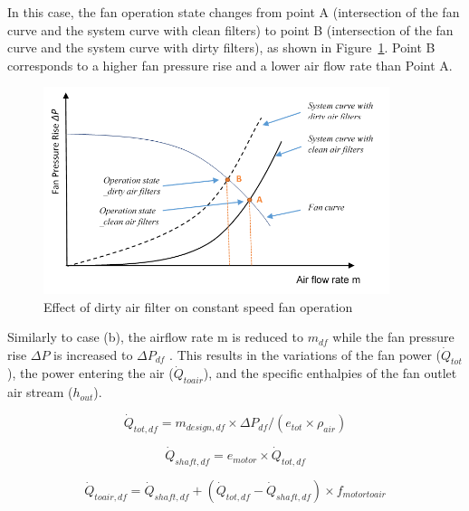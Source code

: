 In this case, the fan operation state changes from point A (intersection of the fan curve and the system curve with clean filters) to point B (intersection of the fan curve and the system curve with dirty filters), as shown in Figure~\ref{fig:effect-of-dirty-air-filter-on-constant-speed}. Point B corresponds to a higher fan pressure rise and a lower air flow rate than Point A.

\begin{figure}[hbtp] %
\centering
\includegraphics[width=0.9\textwidth, height=0.9\textheight, keepaspectratio=true]{media/image8008.png}
\caption{Effect of dirty air filter on constant speed fan operation \protect \label{fig:effect-of-dirty-air-filter-on-constant-speed}}
\end{figure}

Similarly to case (b), the airflow rate m is reduced to \(m_{df}\) while the fan pressure rise \(\Delta P\) is increased to \(\Delta P_{df}\) . This results in the variations of the fan power (\(\dot Q_{tot}\)), the power entering the air (\(\dot Q_{toair}\)), and the specific enthalpies of the fan outlet air stream (\(h_{out}\)).

\begin{equation}
\dot{Q}_{tot,df} = m_{design,df} \times \Delta P_{df} / (e_{tot} \times \rho_{air} )
\end{equation}

\begin{equation}
\dot{Q}_{shaft,df} = e_{motor} \times \dot{Q}_{tot, df}
\end{equation}

\begin{equation}
\dot{Q}_{toair,df} = \dot{Q}_{shaft,df} +( \dot{Q}_{tot,df} - \dot{Q}_{shaft,df}) \times f_{motortoair}
\end{equation}

